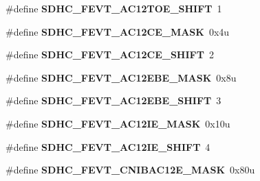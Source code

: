 \begin{DoxyCompactItemize}
\item 
\#define {\bfseries S\+D\+H\+C\+\_\+\+F\+E\+V\+T\+\_\+\+A\+C12\+T\+O\+E\+\_\+\+S\+H\+I\+FT}~1\hypertarget{group__SDHC__Register__Masks_ga655231f1f3f9422f32cf26cfdb56b7d2}{}\label{group__SDHC__Register__Masks_ga655231f1f3f9422f32cf26cfdb56b7d2}

\item 
\#define {\bfseries S\+D\+H\+C\+\_\+\+F\+E\+V\+T\+\_\+\+A\+C12\+C\+E\+\_\+\+M\+A\+SK}~0x4u\hypertarget{group__SDHC__Register__Masks_gabbde9b3a4bf7a5ba098a8793459a93e3}{}\label{group__SDHC__Register__Masks_gabbde9b3a4bf7a5ba098a8793459a93e3}

\item 
\#define {\bfseries S\+D\+H\+C\+\_\+\+F\+E\+V\+T\+\_\+\+A\+C12\+C\+E\+\_\+\+S\+H\+I\+FT}~2\hypertarget{group__SDHC__Register__Masks_ga6765ca9b4ffb1bf49aa914593c6d6476}{}\label{group__SDHC__Register__Masks_ga6765ca9b4ffb1bf49aa914593c6d6476}

\item 
\#define {\bfseries S\+D\+H\+C\+\_\+\+F\+E\+V\+T\+\_\+\+A\+C12\+E\+B\+E\+\_\+\+M\+A\+SK}~0x8u\hypertarget{group__SDHC__Register__Masks_gaf9bf81ce7359d8baeaa6da8d311a17df}{}\label{group__SDHC__Register__Masks_gaf9bf81ce7359d8baeaa6da8d311a17df}

\item 
\#define {\bfseries S\+D\+H\+C\+\_\+\+F\+E\+V\+T\+\_\+\+A\+C12\+E\+B\+E\+\_\+\+S\+H\+I\+FT}~3\hypertarget{group__SDHC__Register__Masks_gad04d7f7589f8abb9ec05a978c7ec2ea9}{}\label{group__SDHC__Register__Masks_gad04d7f7589f8abb9ec05a978c7ec2ea9}

\item 
\#define {\bfseries S\+D\+H\+C\+\_\+\+F\+E\+V\+T\+\_\+\+A\+C12\+I\+E\+\_\+\+M\+A\+SK}~0x10u\hypertarget{group__SDHC__Register__Masks_gae0fbba676b66b6816ebf1a406cde14e2}{}\label{group__SDHC__Register__Masks_gae0fbba676b66b6816ebf1a406cde14e2}

\item 
\#define {\bfseries S\+D\+H\+C\+\_\+\+F\+E\+V\+T\+\_\+\+A\+C12\+I\+E\+\_\+\+S\+H\+I\+FT}~4\hypertarget{group__SDHC__Register__Masks_gaeb6a120837319438325080701d73318b}{}\label{group__SDHC__Register__Masks_gaeb6a120837319438325080701d73318b}

\item 
\#define {\bfseries S\+D\+H\+C\+\_\+\+F\+E\+V\+T\+\_\+\+C\+N\+I\+B\+A\+C12\+E\+\_\+\+M\+A\+SK}~0x80u\hypertarget{group__SDHC__Register__Masks_gab66c71256369c4a831fc9638fea7b8d1}{}\label{group__SDHC__Register__Masks_gab66c71256369c4a831fc9638fea7b8d1}


\end{DoxyCompactItemize}
